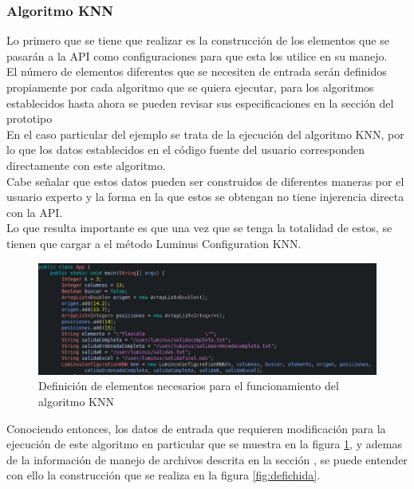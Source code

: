 \subsubsection{Algoritmo KNN}
Lo primero que se tiene que realizar es la construcción de los elementos que se pasarán a la API como configuraciones para que esta los utilice en su manejo. \\
El número de elementos diferentes que se necesiten de entrada serán definidos propiamente por cada algoritmo que se quiera ejecutar, para los algoritmos establecidos hasta ahora se pueden revisar sus especificaciones en la sección  del prototipo \\
En el caso particular del ejemplo se trata de la ejecución del algoritmo KNN, por lo que los datos establecidos en el código fuente del usuario corresponden directamente con este algoritmo. \\
Cabe señalar que estos datos pueden ser construidos de diferentes maneras por el usuario experto y la forma en la que estos se obtengan no tiene injerencia directa con la API.\\
Lo que resulta importante es que una vez que se tenga la totalidad de estos, se tienen que cargar a el método Luminus Configuration KNN.
\begin{figure}[H]
	\begin{center}
		\hypertarget{fig:defi}{\hspace{1pt}}
		\includegraphics[width=1\textwidth]{capitulo4b/images/uno.jpeg}
		\caption{Definición de elementos necesarios para el funcionamiento del algoritmo KNN}
		\label{fig:defi}
	\end{center}
\end{figure}
Conociendo entonces, los datos de entrada que requieren modificación para la ejecución de este algoritmo en particular que se muestra en la figura \ref{fig:defi}, y ademas de la información de manejo de archivos descrita en la sección , se puede entender con ello la construcción que se realiza en la figura \ref{fig:defichida}. \\
